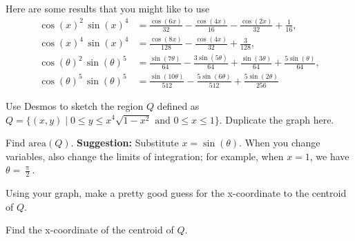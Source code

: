 \documentclass[12pt,fleqn]{exam}
\begin{document}
Here are some results that you might like to use
\begin{align*}
 {{\cos{(x)}}^{2}}\, {{\sin{(x)}}^{4}} &=\frac{\cos{\left( 6 x\right) }}{32}-\frac{\cos{\left( 4 x\right) }}{16}-\frac{\cos{\left( 2 x\right) }}{32}+\frac{1}{16}, \\
 {{\cos{(x)}}^{4}}\, {{\sin{(x)}}^{4}} &=\frac{\cos{\left( 8 x\right) }}{128}-\frac{\cos{\left( 4 x\right) }}{32}+\frac{3}{128}, \\
 {{\cos{(\theta)}}^{2}}\, {{\sin{(\theta)}}^{5}}&=\frac{\sin{\left( 7 \theta\right) }}{64}-\frac{3 \sin{\left( 5 \theta\right) }}{64}+\frac{\sin{\left( 3 \theta\right) }}{64}+\frac{5 \sin{(\theta)}}{64},\\
 {{\cos{(\theta)}}^{5}}\, {{\sin{(\theta)}}^{5}}&=\frac{\sin{\left( 10 \theta\right) }}{512}-\frac{5 \sin{\left( 6 \theta\right) }}{512}+\frac{5 \sin{\left( 2 \theta\right) }}{256}
\end{align*}
\begin{questions}

    \question[2]  Use Desmos to sketch the region $Q$ defined as $Q = \{(x,y) \mid 0 \leq y \leq x^4 \sqrt{1-x^2}
    \mbox{ and } 0 \leq x \leq 1 \}$. Duplicate
    the graph here.
    \begin{solution}[2.0in]
    \end{solution}
    
    \question[2] Find $\mbox{area}(Q)$. \textbf{Suggestion:} Substitute $x = \sin(\theta)$. When you change variables,
    also change  the limits of integration; for example, when $x=1$, we have $\theta = \frac{\uppi}{2}$.
  \begin{solution}%
    \end{solution}
        \newpage
        \question[2] Using your graph, make a pretty good guess for the x-coordinate to the centroid of $Q$.
  \begin{solution}[1.0in]
    \end{solution}
    

    
       \question[2] Find the x-coordinate of the centroid of $Q$.
  \begin{solution}[2.0in]
    \end{solution}
\end{questions}
\end{document}
